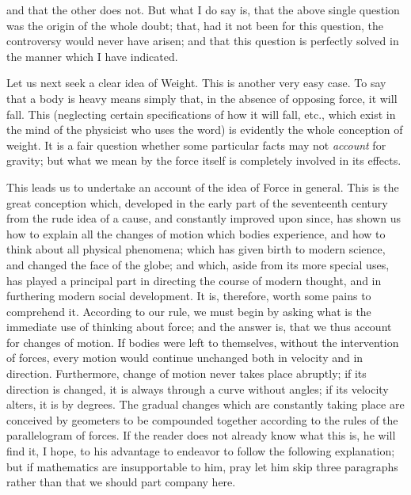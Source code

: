 and that the other does not. But what I do say is, that the above single question was the origin of the whole doubt; that, had it not been for this question, the controversy would never have arisen; and that this question is perfectly solved in the manner which I have indicated. 


Let us next seek a clear idea of Weight. This is another very easy case. To say that a body is heavy means simply that, in the absence of opposing force, it will fall. This (neglecting certain specifications of how it will fall, etc., which exist in the mind of the physicist who uses the word) is evidently the whole conception of weight. It is a fair question whether some particular facts may not \emph{account} for gravity;  but what we mean by the force itself is completely involved in its effects.
 
This leads us to undertake an account of the idea of Force in general. This is the great conception which, developed in the early part of the seventeenth century from the rude idea of a cause, and constantly improved upon since, has shown us how to explain all the changes of motion which bodies experience, and how to think about all physical phenomena; which has given birth to modern science, and changed the face of the globe; and which, aside from its more special uses, has played a principal part in directing the course of modern thought, and in furthering modern social development. It is, therefore, worth some pains to comprehend it. According to our rule, we must begin by asking what is the immediate use of thinking about force; and the answer is, that we thus account for changes of motion. If bodies were left to themselves, without the intervention of forces, every motion would continue unchanged both in velocity and in direction. Furthermore, change of motion never takes place abruptly; if its direction is changed, it is always through a curve without angles; if its velocity alters, it is by degrees. The gradual changes which are constantly taking place are conceived by geometers to be compounded together according to the rules of the parallelogram of forces. If the reader does not already know what this is, he will find it, I hope, to his advantage to endeavor to follow the following explanation; but if mathematics are insupportable to him, pray let him skip three paragraphs rather than that we should part company here.


